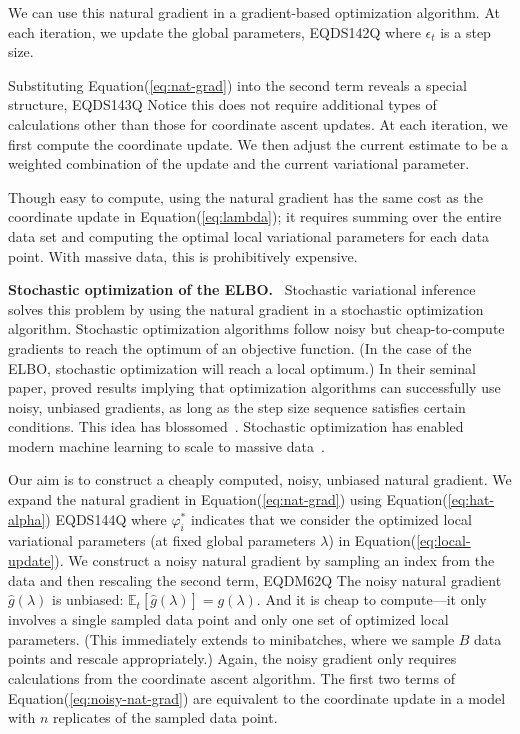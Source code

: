 \documentclass{article}
\DeclareRobustCommand{\parhead}[1]{\textbf{#1}~}
\begin{document}
We can use this natural gradient in a gradient-based optimization
algorithm.  At each iteration, we update the global parameters,
EQDS142Q
where $\epsilon_t$ is a step size.

Substituting Equation\nobreakspace \textup {(\ref {eq:nat-grad})} into the second term reveals a special
structure,
EQDS143Q
Notice this does not require additional types of calculations other
than those for coordinate ascent updates.  At each iteration, we first
compute the coordinate update. We then adjust the current estimate to
be a weighted combination of the update and the current variational
parameter.

Though easy to compute, using the natural gradient has the same cost
as the coordinate update in Equation\nobreakspace \textup {(\ref {eq:lambda})}; it requires summing over
the entire data set and computing the optimal local variational
parameters for each data point.  With massive data, this is prohibitively expensive.

\parhead{Stochastic optimization of the \gls{ELBO}.} Stochastic
variational inference solves this problem by using the natural
gradient in a stochastic optimization algorithm. Stochastic
optimization algorithms follow noisy but cheap-to-compute gradients to
reach the optimum of an objective function.  (In the case of the
\gls{ELBO}, stochastic optimization will reach a local optimum.) In
their seminal paper, \citet{Robbins:1951} proved results implying that
optimization algorithms can successfully use noisy, unbiased
gradients, as long as the step size sequence satisfies certain
conditions.  This idea has
blossomed~\citep{Spall:2003,Kushner:1997}. Stochastic optimization has
enabled modern machine learning to scale to massive
data~\citep{Bottou:2004}.

Our aim is to construct a cheaply computed, noisy, unbiased natural
gradient. We expand the natural gradient in Equation\nobreakspace \textup {(\ref {eq:nat-grad})} using
Equation\nobreakspace \textup {(\ref {eq:hat-alpha})}
EQDS144Q
where $\varphi^*_i$ indicates that we consider the optimized local
variational parameters (at fixed global parameters $\lambda$) in
Equation\nobreakspace \textup {(\ref {eq:local-update})}.  We construct a noisy natural gradient by
sampling an index from the data and then rescaling the second term,
EQDM62Q
The noisy natural gradient $\hat{g}(\lambda)$ is unbiased:
${\mathbb{E}_{{t}}\left[{\hat{g}(\lambda)}\right]} = g(\lambda)$.  And it is cheap to
compute---it only involves a single sampled data point and only one
set of optimized local parameters.  (This immediately extends to
minibatches, where we sample $B$ data points and rescale
appropriately.)  Again, the noisy gradient only requires calculations
from the coordinate ascent algorithm.  The first two terms of
Equation\nobreakspace \textup {(\ref {eq:noisy-nat-grad})} are equivalent to the coordinate update in a
model with $n$ replicates of the sampled data point.
\end{document}
